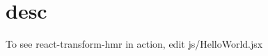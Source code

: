 \chapter{desc}
\hypertarget{md__d_1_2_g_i_t_2_food_link_2foodlink_8client_2node__modules_2bs-recipes_2recipes_2webpack_8react-transform-hmr_2desc}{}\label{md__d_1_2_g_i_t_2_food_link_2foodlink_8client_2node__modules_2bs-recipes_2recipes_2webpack_8react-transform-hmr_2desc}
To see {\ttfamily react-\/transform-\/hmr} in action, edit {\ttfamily js/\+Hello\+World.\+jsx} 